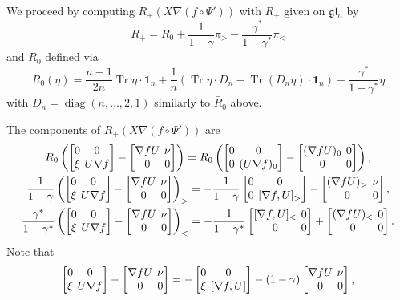 \documentclass{amsart}
\theoremstyle{definition}
\theoremstyle{remark}
\numberwithin{equation}{section}
\numberwithin{theorem}{section}
\def\nablac{{\nabla}}
\def\gl{\mathfrak g\mathfrak l}
\def\nar{\setlength\arraycolsep{2pt}}
\def\one{\mathbf 1}
\def\Tr{\operatorname{Tr}}
\def\diag{\operatorname{diag}}
\begin{document}
We proceed by computing $R_+(X\nabla (f\circ\Psi'))$ with $R_+$ given  on $\gl_n$ by
\[
R_+=R_0+\frac1{1-\gamma}\pi_>-\frac{\gamma^*}{1-\gamma^*}\pi_<
\]
and $R_0$ defined via
\begin{equation}\label{R0}
R_0(\eta)=\frac{n-1}{2n}\Tr\eta{\cdot}\one_n+\frac1n\left(\Tr\eta{\cdot} D_n-\Tr(D_n\eta){\cdot}\one_n\right)
-\frac{\gamma^*}{1-\gamma^*}\eta
\end{equation}
with $D_n=\diag(n,\dots,2,1)$ similarly to $\bar R_0$ above. 


The components of $R_+(X\nabla(f\circ\Psi'))$ are
\begin{gather*}
 R_0\left(\nar\begin{bmatrix} 0 & 0\cr \xi& U\nablac f\end{bmatrix}
-\begin{bmatrix}\nablac f U&\nu\cr 0 & 0\end{bmatrix}\right)=
R_0\left(\nar\begin{bmatrix} 0 & 0\cr 0& (U\nablac f)_0\end{bmatrix}
-\begin{bmatrix}(\nablac f U)_0&0\cr 0 & 0\end{bmatrix}\right),\\
\frac1{1-\gamma}\left(\nar\begin{bmatrix} 0 & 0\cr \xi& U\nablac f\end{bmatrix}
-\begin{bmatrix}\nablac f U&\nu\cr 0 & 0\end{bmatrix}\right)_>=
-\frac1{1-\gamma}\nar\begin{bmatrix} 0&0\cr 0& [\nablac f, U]_>\end{bmatrix}-\begin{bmatrix}(\nablac fU)_>& \nu\cr 0&0\end{bmatrix},\\
\frac{\gamma^*}{1-\gamma^*}\left(\nar\begin{bmatrix} 0 & 0\cr \xi& U\nablac f\end{bmatrix}
-\begin{bmatrix}\nablac f U&\nu\cr 0 & 0\end{bmatrix}\right)_<=
-\frac1{1-\gamma^*}\nar\begin{bmatrix} [\nablac f,U]_<&0\cr 0& 0\end{bmatrix}+ \begin{bmatrix}(\nablac fU)_<& 0\cr 0&0\end{bmatrix}.
\end{gather*}
Note that
\[
\nar\begin{bmatrix} 0 & 0\cr \xi& U\nablac f\end{bmatrix}-\begin{bmatrix}\nablac f U&\nu\cr 0 & 0\end{bmatrix}=
-\begin{bmatrix} 0 & 0\cr \xi& [\nablac f,U]\end{bmatrix}-(1-\gamma)\begin{bmatrix}\nablac f U&\nu\cr 0 & 0\end{bmatrix},
\]
\end{document}
